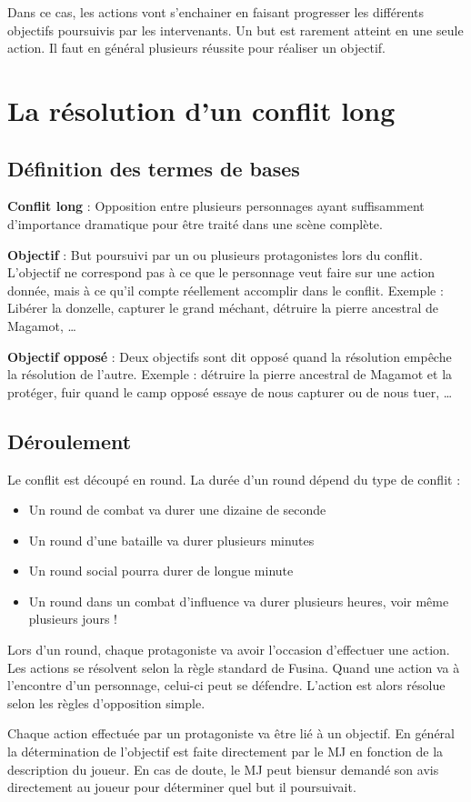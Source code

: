 \begin{multicols}{2}
	Dans ce cas, les actions vont s'enchainer en faisant progresser les différents objectifs poursuivis par les intervenants. Un but est rarement atteint en une seule action. Il faut en général plusieurs réussite pour réaliser un objectif. 

	

\section{La résolution d'un conflit long}

\subsection{Définition des termes de bases}

\textbf{Conflit long} : Opposition entre plusieurs personnages ayant suffisamment d’importance dramatique pour être traité dans une scène complète.

\textbf{Objectif} : But poursuivi par un ou plusieurs protagonistes lors du conflit. L’objectif ne correspond pas à ce que le personnage veut faire sur une action donnée, mais à ce qu’il compte réellement accomplir dans le conflit. Exemple : Libérer la donzelle, capturer le grand méchant, détruire la pierre ancestral de Magamot, …

\textbf{Objectif opposé} : Deux objectifs sont dit opposé quand la résolution empêche la résolution de l’autre. Exemple : détruire la pierre ancestral de Magamot et la protéger, fuir quand le camp opposé essaye de nous capturer ou de nous tuer, …

\subsection{Déroulement}

Le conflit est découpé en round. La durée d’un round dépend du type de conflit :

\begin{itemize}
\item Un round de combat va durer une dizaine de seconde
\item Un round d’une bataille va durer plusieurs minutes
\item Un round social pourra durer de longue minute
\item Un round dans un combat d’influence va durer plusieurs heures, voir même plusieurs jours !
\end{itemize}

Lors d’un round, chaque protagoniste va avoir l’occasion d’effectuer une action. Les actions se résolvent selon la règle standard de Fusina. Quand une action va à l’encontre d’un personnage, celui-ci peut se défendre. L’action est alors résolue selon les règles d’opposition simple.


Chaque action effectuée par un protagoniste va être lié à un objectif. En général la détermination de l’objectif est faite directement par le MJ en fonction de la description du joueur. En cas de doute, le MJ peut biensur demandé son avis directement au joueur pour déterminer quel but il poursuivait.

\end{multicols}

